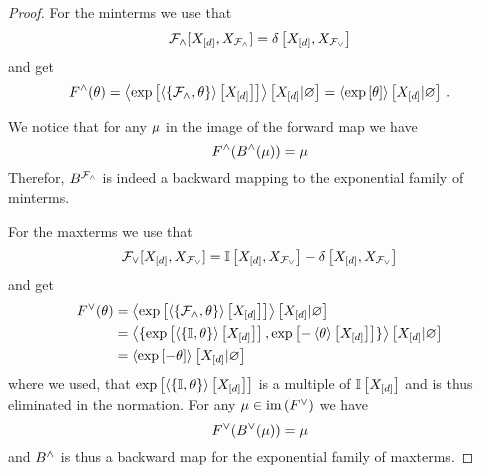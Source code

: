 \begin{proof}
	For the minterms we use that
		\[ \mathcal{F}_{\land}[X_{[d]},X_{\mathcal{F}_{\land}}]  = \delta\left[X_{[d]},X_{\mathcal{F}_{\lor}}\right]\] 
	and get
		\[ F^{\land}(\theta) 
		= \left\langle 
		\mathrm{exp}\left[\left\langle \{\mathcal{F}_{\land}, \theta\}\right\rangle \left[ X_{[d]} \right]\right]
		\right\rangle \left[ X_{[d]} | \varnothing \right]
		= 
		\left\langle \mathrm{exp}\left[\theta\right]\right\rangle \left[ X_{[d]} | \varnothing \right] \, . 
		\]
	
	We notice that for any $\mu$ in the image of the forward map we have
		\[ F^{\land}(B^{\land}(\mu)) = \mu \]
	Therefor, $B^{\mathcal{F}_{\land}}$ is indeed a backward mapping to the exponential family of minterms.
	
	For the maxterms we use that
		\[ \mathcal{F}_{\lor}[X_{[d]},X_{\mathcal{F}_{\lor}}] = \mathbb{I}\left[X_{[d]},X_{\mathcal{F}_{\lor}}\right]-\delta\left[X_{[d]},X_{\mathcal{F}_{\lor}}\right] \]
	and get
	\begin{align*}
		F^{\lor}(\theta) 
		& = \left\langle 
		\mathrm{exp}\left[\left\langle \{\mathcal{F}_{\land}, \theta\}\right\rangle \left[ X_{[d]} \right]\right]
		\right\rangle \left[ X_{[d]} | \varnothing \right] \\
		& = \left\langle \{
		\mathrm{exp}\left[\left\langle \{\mathbb{I}, \theta\}\right\rangle \left[ X_{[d]} \right]\right], 
		\mathrm{exp}\left[-\left\langle \theta\right\rangle \left[ X_{[d]} \right]\right] \}
		\right\rangle \left[ X_{[d]} | \varnothing \right] \\
		& = \left\langle 
		\mathrm{exp}\left[-\theta\right]
		\right\rangle \left[ X_{[d]} | \varnothing \right]
	\end{align*}
	where we used, that $\mathrm{exp}\left[\left\langle \{\mathbb{I}, \theta\}\right\rangle \left[ X_{[d]} \right]\right]$ is a multiple of $\mathbb{I}\left[X_{[d]}\right]$ and is thus eliminated in the normation.
	For any $\mu\in\mathrm{im}\left(F^{\lor}\right)$ we have
		\[ F^{\lor}(B^{\lor}(\mu) ) 
		= \mu
		\]
	and $B^{\land}$ is thus a backward map for the exponential family of maxterms.
\end{proof}



